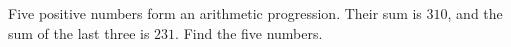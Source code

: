 Five positive numbers form an arithmetic progression. Their sum is $310$, and the sum of the last three is $231$. Find the five numbers.

